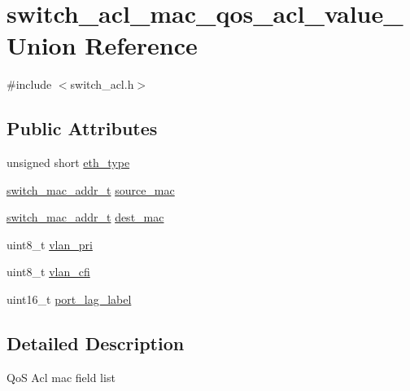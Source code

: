 \hypertarget{unionswitch__acl__mac__qos__acl__value__}{\section{switch\+\_\+acl\+\_\+mac\+\_\+qos\+\_\+acl\+\_\+value\+\_\+ Union Reference}
\label{unionswitch__acl__mac__qos__acl__value__}
}


{\ttfamily \#include $<$switch\+\_\+acl.\+h$>$}

\subsection*{Public Attributes}
\begin{DoxyCompactItemize}
\item 
unsigned short \hyperlink{unionswitch__acl__mac__qos__acl__value___a80a80199c9b901817154d82e462de47c}{eth\+\_\+type}
\item 
\hyperlink{structswitch__mac__addr__s}{switch\+\_\+mac\+\_\+addr\+\_\+t} \hyperlink{unionswitch__acl__mac__qos__acl__value___a7b7f6d9ee00436e5ff87e441a53f93b9}{source\+\_\+mac}
\item 
\hyperlink{structswitch__mac__addr__s}{switch\+\_\+mac\+\_\+addr\+\_\+t} \hyperlink{unionswitch__acl__mac__qos__acl__value___aa28bfa3b0096d78e6dbe0234c6a36136}{dest\+\_\+mac}
\item 
uint8\+\_\+t \hyperlink{unionswitch__acl__mac__qos__acl__value___a1fb10d16c194d6b9c4e1cb5b01a9af9a}{vlan\+\_\+pri}
\item 
uint8\+\_\+t \hyperlink{unionswitch__acl__mac__qos__acl__value___a03d5c55bd7ffecaafbb379be16319c9c}{vlan\+\_\+cfi}
\item 
uint16\+\_\+t \hyperlink{unionswitch__acl__mac__qos__acl__value___ae8ef63c353711ba47e671c7e1848be7e}{port\+\_\+lag\+\_\+label}
\end{DoxyCompactItemize}


\subsection{Detailed Description}
Qo\+S Acl mac field list 

